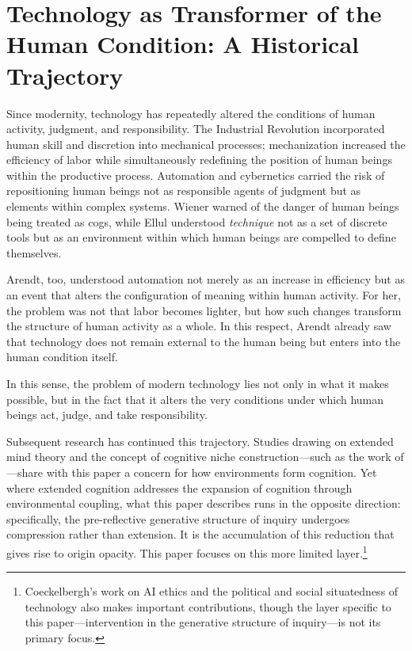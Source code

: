 \documentclass[12pt]{article}
\begin{document}
\section{Technology as Transformer of the Human Condition: A Historical Trajectory}

Since modernity, technology has repeatedly altered the conditions of human activity, judgment, and responsibility. The Industrial Revolution incorporated human skill and discretion into mechanical processes; mechanization increased the efficiency of labor while simultaneously redefining the position of human beings within the productive process. Automation and cybernetics carried the risk of repositioning human beings not as responsible agents of judgment but as elements within complex systems. Wiener warned of the danger of human beings being treated as cogs, while Ellul understood \textit{technique} not as a set of discrete tools but as an environment within which human beings are compelled to define themselves.

Arendt, too, understood automation not merely as an increase in efficiency but as an event that alters the configuration of meaning within human activity. For her, the problem was not that labor becomes lighter, but how such changes transform the structure of human activity as a whole. In this respect, Arendt already saw that technology does not remain external to the human being but enters into the human condition itself.

In this sense, the problem of modern technology lies not only in what it makes possible, but in the fact that it alters the very conditions under which human beings act, judge, and take responsibility.

Subsequent research has continued this trajectory. Studies drawing on extended mind theory and the concept of cognitive niche construction---such as the work of \citet{heersmink2021}---share with this paper a concern for how environments form cognition. Yet where extended cognition addresses the expansion of cognition through environmental coupling, what this paper describes runs in the opposite direction: specifically, the pre-reflective generative structure of inquiry undergoes compression rather than extension. It is the accumulation of this reduction that gives rise to origin opacity. This paper focuses on this more limited layer.\footnote{Coeckelbergh's work on AI ethics and the political and social situatedness of technology \citep{coeckelbergh2020} also makes important contributions, though the layer specific to this paper---intervention in the generative structure of inquiry---is not its primary focus.}
\end{document}
